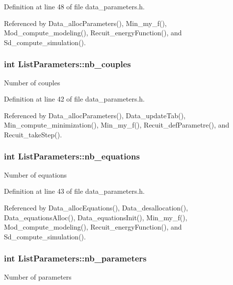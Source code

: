 Definition at line 48 of file data\_\-parameters.h.



Referenced by Data\_\-allocParameters(), Min\_\-my\_\-f(), Mod\_\-compute\_\-modeling(), Recuit\_\-energyFunction(), and Sd\_\-compute\_\-simulation().

\hypertarget{structListParameters_a78464fa8003787f72be81b561fcd141a}{
\subsubsection[{nb\_\-couples}]{\setlength{\rightskip}{0pt plus 5cm}int {\bf ListParameters::nb\_\-couples}}}
\label{structListParameters_a78464fa8003787f72be81b561fcd141a}
Number of couples 

Definition at line 42 of file data\_\-parameters.h.



Referenced by Data\_\-allocParameters(), Data\_\-updateTab(), Min\_\-compute\_\-minimization(), Min\_\-my\_\-f(), Recuit\_\-defParametre(), and Recuit\_\-takeStep().

\hypertarget{structListParameters_a45a3376021fb8e41738aa3452d7c0dbb}{
\subsubsection[{nb\_\-equations}]{\setlength{\rightskip}{0pt plus 5cm}int {\bf ListParameters::nb\_\-equations}}}
\label{structListParameters_a45a3376021fb8e41738aa3452d7c0dbb}
Number of equations 

Definition at line 43 of file data\_\-parameters.h.



Referenced by Data\_\-allocEquations(), Data\_\-desallocation(), Data\_\-equationsAlloc(), Data\_\-equationsInit(), Min\_\-my\_\-f(), Mod\_\-compute\_\-modeling(), Recuit\_\-energyFunction(), and Sd\_\-compute\_\-simulation().

\hypertarget{structListParameters_a079cdc6651256ac5ee10e546fc01ebba}{
\subsubsection[{nb\_\-parameters}]{\setlength{\rightskip}{0pt plus 5cm}int {\bf ListParameters::nb\_\-parameters}}}
\label{structListParameters_a079cdc6651256ac5ee10e546fc01ebba}
Number of parameters 

